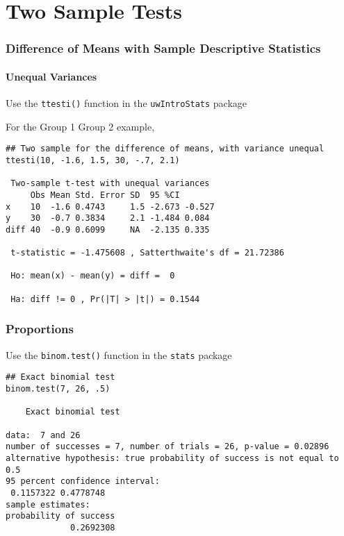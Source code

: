 \documentclass[pdf]{beamer}
\begin{document}
\section{Two Sample Tests}
\begin{frame}[fragile]
\frametitle{Difference of Means with Sample Descriptive Statistics}
\framesubtitle{Unequal Variances}
Use the \texttt{ttesti()} function in the \texttt{uwIntroStats} package

For the Group 1 Group 2 example,
{\fontsize{6pt}{7.2}\selectfont
\begin{verbatim}
## Two sample for the difference of means, with variance unequal
ttesti(10, -1.6, 1.5, 30, -.7, 2.1)

 Two-sample t-test with unequal variances 
     Obs Mean Std. Error SD  95 %CI       
x    10  -1.6 0.4743     1.5 -2.673 -0.527
y    30  -0.7 0.3834     2.1 -1.484 0.084 
diff 40  -0.9 0.6099     NA  -2.135 0.335 

 t-statistic = -1.475608 , Satterthwaite's df = 21.72386 

 Ho: mean(x) - mean(y) = diff =  0 

 Ha: diff != 0 , Pr(|T| > |t|) = 0.1544 
\end{verbatim}}
\end{frame}

\begin{frame}[fragile]
\frametitle{Proportions}
Use the \texttt{binom.test()} function in the \texttt{stats} package

{\fontsize{6pt}{7.2}\selectfont
\begin{verbatim}
## Exact binomial test
binom.test(7, 26, .5)

	Exact binomial test

data:  7 and 26
number of successes = 7, number of trials = 26, p-value = 0.02896
alternative hypothesis: true probability of success is not equal to 0.5
95 percent confidence interval:
 0.1157322 0.4778748
sample estimates:
probability of success 
             0.2692308 
\end{verbatim}}
\end{frame}
\end{document}
